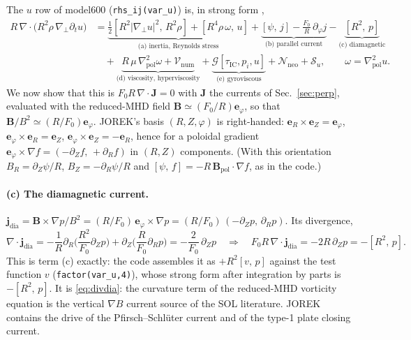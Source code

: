 \documentclass[11pt,a4paper]{article}
\newcommand{\bB}{\mathbf{B}}
\newcommand{\bJ}{\mathbf{J}}
\newcommand{\ephi}{\mathbf{e}_\varphi}
\newcommand{\eR}{\mathbf{e}_R}
\newcommand{\eZ}{\mathbf{e}_Z}
\newcommand{\gradp}{\nabla_{\!\perp}}
\newcommand{\divg}{\nabla\!\cdot\!}
\newcommand{\jdia}{\mathbf{j}_{\mathrm{dia}}}
\newcommand{\pb}[2]{\left[#1,\,#2\right]}
\newcommand{\code}[1]{\texttt{#1}}
\newcommand{\tauic}{\tau_{\mathrm{IC}}}
\begin{document}
The $u$ row of model600 (\code{rhs\_ij(var\_u)}) is, in strong form \cite{ernote},
\begin{equation}
\begin{aligned}
  R\,\divg\big(R^2\rho\,\gradp\partial_t u\big)
  &= \underbrace{\tfrac12\pb{R^2|\gradp u|^2}{R^2\rho} + \pb{R^4\rho\,\omega}{u}}_{\text{(a) inertia, Reynolds stress}}
   + \underbrace{\pb{\psi}{j} - \frac{F_0}{R}\,\partial_\varphi j}_{\text{(b) parallel current}}
   - \underbrace{\pb{R^2}{p}}_{\text{(c) diamagnetic}} \\
  &\quad + \underbrace{R\,\mu\,\nabla^2_{\mathrm{pol}}\omega + \mathcal{V}_{\mathrm{num}}}_{\text{(d) viscosity, hyperviscosity}}
   + \underbrace{\mathcal{G}[\tauic,p_i,u]}_{\text{(e) gyroviscous}}
   + \mathcal{N}_{\mathrm{neo}} + \mathcal{S}_u ,
   \qquad \omega = \nabla^2_{\mathrm{pol}}u .
\end{aligned}
\label{eq:vort}
\end{equation}
We now show that this is $F_0 R\,\divg\bJ = 0$ with $\bJ$ the currents of Sec.~\ref{sec:perp}, evaluated with the
reduced-MHD field $\bB\simeq(F_0/R)\ephi$, so that $\bB/B^2 \simeq (R/F_0)\ephi$. JOREK's basis $(R,Z,\varphi)$ is
right-handed: $\eR\times\eZ = \ephi$, $\ephi\times\eR = \eZ$, $\ephi\times\eZ = -\eR$, hence for a poloidal gradient
$\ephi\times\nabla f = (-\partial_Z f,\,+\partial_R f)$ in $(R,Z)$ components. (With this orientation
$B_R = \partial_Z\psi/R$, $B_Z = -\partial_R\psi/R$ and $\pb{\psi}{f} = -R\,\bB_{\mathrm{pol}}\!\cdot\!\nabla f$, as in
the code.)

\paragraph{(c) The diamagnetic current.}
$\jdia = \bB\times\nabla p/B^2 = (R/F_0)\,\ephi\times\nabla p = (R/F_0)\,(-\partial_Z p,\,\partial_R p)$. Its divergence,
\begin{equation}
  \divg\jdia = -\frac{1}{R}\partial_R\Big(\frac{R^2}{F_0}\partial_Z p\Big) + \partial_Z\Big(\frac{R}{F_0}\partial_R p\Big)
  = -\frac{2}{F_0}\,\partial_Z p
  \quad\Longrightarrow\quad
  F_0 R\,\divg\jdia = -2R\,\partial_Z p = -\pb{R^2}{p}.
  \label{eq:cterm}
\end{equation}
This is term (c) exactly: the code assembles it as $+R^2\pb{v}{p}$ against the test function $v$
(\code{factor(var\_u,4)}), whose strong form after integration by parts is $-\pb{R^2}{p}$. It is \eqref{eq:divdia}:
the curvature term of the reduced-MHD vorticity equation is the vertical $\nabla B$ current source of the SOL
literature. JOREK contains the drive of the Pfirsch--Schl\"uter current
and of the type-1 plate closing current.
\end{document}
